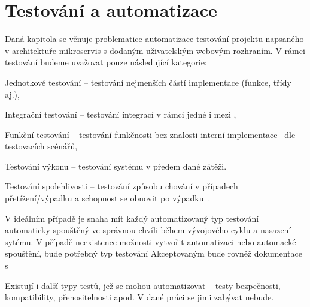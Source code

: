 
\section{Testování a automatizace}

Daná kapitola se věnuje problematice automatizace testování projektu napsaného v architektuře mikroservis s dodaným uživatelským webovým rozhraním.
V rámci testování budeme uvažovat pouze následující kategorie:

\begin{dl}
   \item[Jednotkové testování] – testování nejmenších částí implementace (funkce, třídy aj.),
   \item[Integrační testování] – testování integrací v rámci jedné  i mezi ,
   \item[Funkční testování] – testování funkčnosti bez znalosti interní implementace~\cite{testtypes} dle testovacích scénářů,
   \item[Testování výkonu] – testování systému v předem dané zátěži.
   \item[Testování spolehlivosti] – testování způsobu chování v případech přetížení/výpadku a schopnost se obnovit po výpadku~\cite{testtypes2}.
\end{dl}

V ideálním případě je snaha mít každý automatizovaný typ testování automaticky spouštěný ve správnou chvíli během vývojového cyklu a nasazení sytému.
V případě neexistence možnosti vytvořit automatizaci nebo automacké spouštění, bude potřebný typ testování
Akceptovaným bude rovněž dokumentace s


Existují i další typy testů, jež se mohou automatizovat – testy bezpečnosti, kompatibility, přenositelnosti apod.
V dané práci se jimi zabývat nebude.

